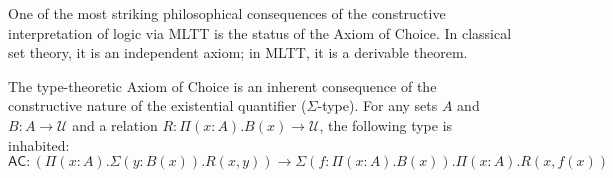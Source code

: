 \begin{definition}
\begin{mathpar}





\end{mathpar}
\end{definition}

One of the most striking philosophical consequences of the constructive interpretation of logic via MLTT is the status of the Axiom of Choice. In classical set theory, it is an independent axiom; in MLTT, it is a derivable theorem.

\begin{theorem}
\label{thm:ac_mltt}
The type-theoretic Axiom of Choice is an inherent consequence of the constructive nature of the existential quantifier ($\Sigma$-type). For any sets $A$ and $B : A \to \mathcal{U}$ and a relation $R : \Pi(x:A). B(x) \to \mathcal{U}$, the following type is inhabited:
\[
\mathsf{AC} : \left(\Pi(x:A). \Sigma(y:B(x)). R(x, y)\right) \to \Sigma\left(f:\Pi(x:A).B(x)\right). \Pi(x:A).R(x, f(x))
\]
\end{theorem}


